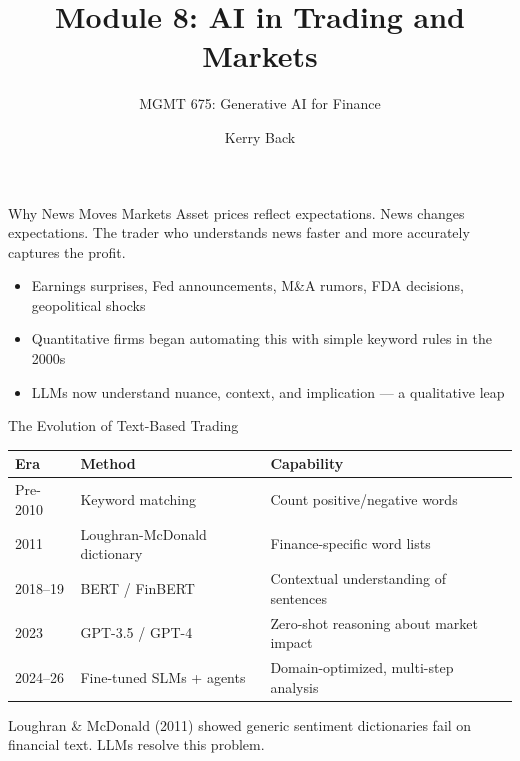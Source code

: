 \documentclass[aspectratio=169]{beamer}
\subtitle{MGMT 675: Generative AI for Finance}
\title{Module 8: AI in Trading and Markets}
\author{Kerry Back}
\date{}
\begin{document}
\maketitle


\begin{frame}{Why News Moves Markets}
Asset prices reflect expectations. News changes expectations. The trader who \alert{understands news faster and more accurately} captures the profit.
\vspace{0.3cm}
\begin{itemize}
  \item Earnings surprises, Fed announcements, M\&A rumors, FDA decisions, geopolitical shocks
  \item Quantitative firms began automating this with simple keyword rules in the 2000s
  \item \alert{LLMs now understand nuance, context, and implication} --- a qualitative leap
\end{itemize}
\end{frame}

\begin{frame}{The Evolution of Text-Based Trading}
\begin{center}
\small
\begin{tabular}{@{} l l l @{}}
\toprule
\textbf{Era} & \textbf{Method} & \textbf{Capability} \\
\midrule
Pre-2010 & Keyword matching & Count positive/negative words \\
2011 & Loughran-McDonald dictionary & Finance-specific word lists \\
2018--19 & BERT / FinBERT & Contextual understanding of sentences \\
2023 & GPT-3.5 / GPT-4 & Zero-shot reasoning about market impact \\
2024--26 & Fine-tuned SLMs + agents & Domain-optimized, multi-step analysis \\
\bottomrule
\end{tabular}
\end{center}
\vspace{0.3cm}
Loughran \& McDonald (2011) showed generic sentiment dictionaries fail on financial text. LLMs resolve this problem.
\end{frame}

\end{document}
